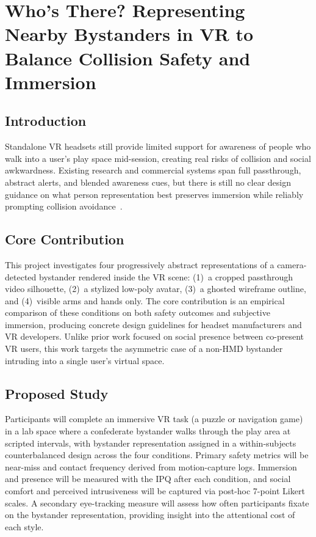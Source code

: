 \documentclass{styling/vgtc}                          %
\begin{document}
\section{Who's There? Representing Nearby Bystanders in VR to Balance Collision Safety and Immersion}

\subsection{Introduction}

Standalone VR headsets still provide limited support for awareness of people
who walk into a user's play space mid-session, creating real risks of
collision and social awkwardness. Existing research and commercial systems
span full passthrough, abstract alerts, and blended awareness cues, but there
is still no clear design guidance on what person representation best
preserves immersion while reliably prompting collision avoidance~\cite{ohagan2023bystander,qin2024brokenwall}.

\subsection{Core Contribution}

This project investigates four progressively abstract representations of a
camera-detected bystander rendered inside the VR scene: (1)~a cropped
passthrough video silhouette, (2)~a stylized low-poly avatar, (3)~a ghosted
wireframe outline, and (4)~visible arms and hands only. The core contribution
is an empirical comparison of these conditions on both safety outcomes and
subjective immersion, producing concrete design guidelines for headset
manufacturers and VR developers. Unlike prior work focused on social presence
between co-present VR users, this work targets the asymmetric case of a
non-HMD bystander intruding into a single user's virtual space.

\subsection{Proposed Study}

Participants will complete an immersive VR task (a puzzle or navigation
game) in a lab space where a confederate bystander walks through the play
area at scripted intervals, with bystander representation assigned in a
within-subjects counterbalanced design across the four conditions. Primary
safety metrics will be near-miss and contact frequency derived from
motion-capture logs. Immersion and presence will be measured with the IPQ
after each condition, and social comfort and perceived intrusiveness will be
captured via post-hoc 7-point Likert scales. A secondary eye-tracking
measure will assess how often participants fixate on the bystander
representation, providing insight into the attentional cost of each style.
\end{document}
